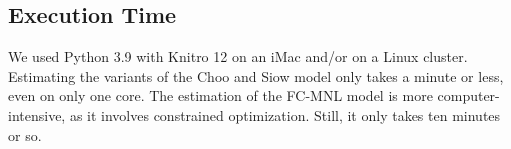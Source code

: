 \documentclass[11pt]{article}
\theoremstyle{plain}
\theoremstyle{definition}
\begin{document}
\subsection{Execution Time}
We used Python 3.9 with Knitro 12 on an iMac and/or on a Linux cluster. Estimating the variants of the Choo and Siow model only takes a minute or less, even on only one core.  The estimation of the FC-MNL model is more computer-intensive, as it involves constrained optimization. Still, it only takes ten minutes or so. 
\end{document}
